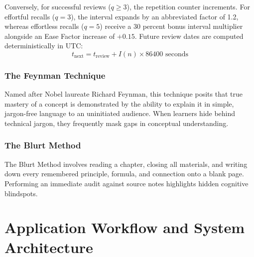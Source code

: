 \documentclass[12pt,a4paper,oneside]{report}
\begin{document}
Conversely, for successful reviews ($q \ge 3$), the repetition counter increments. For effortful recalls ($q = 3$), the interval expands by an abbreviated factor of 1.2, whereas effortless recalls ($q = 5$) receive a 30 percent bonus interval multiplier alongside an Ease Factor increase of $+0.15$. Future review dates are computed deterministically in UTC:
\begin{equation}
    t_{\text{next}} = t_{\text{review}} + I(n) \times 86400 \text{ seconds}
\end{equation}

\subsection{The Feynman Technique}
Named after Nobel laureate Richard Feynman, this technique posits that true mastery of a concept is demonstrated by the ability to explain it in simple, jargon-free language to an uninitiated audience. When learners hide behind technical jargon, they frequently mask gaps in conceptual understanding.

\subsection{The Blurt Method}
The Blurt Method involves reading a chapter, closing all materials, and writing down every remembered principle, formula, and connection onto a blank page. Performing an immediate audit against source notes highlights hidden cognitive blindspots.

\newpage

\chapter{Application Workflow and System Architecture}
\end{document}
